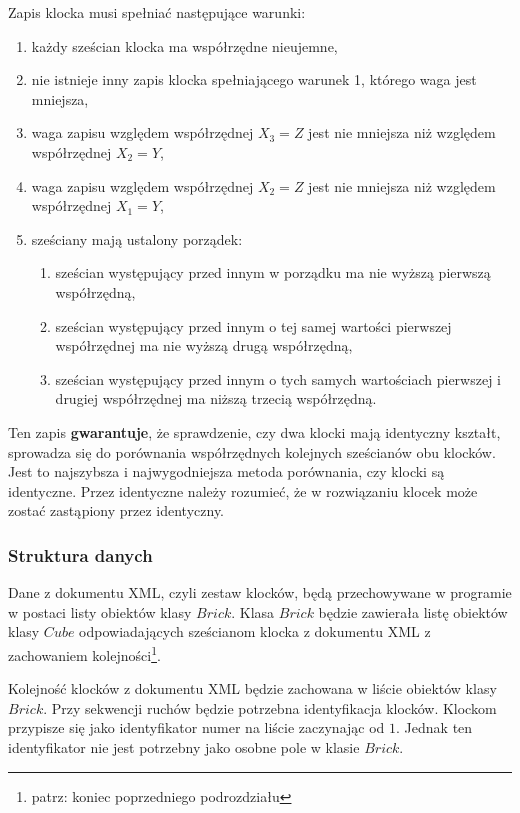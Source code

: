 \documentclass[12pt]{article}
\begin{document}
Zapis klocka musi spełniać następujące warunki:
\begin{enumerate}
	\item każdy sześcian klocka ma współrzędne nieujemne,
	\item nie istnieje inny zapis klocka spełniającego warunek 1, którego
		waga jest mniejsza,
	\item waga zapisu względem współrzędnej $X_3=Z$ jest nie mniejsza niż 
		względem współrzędnej $X_2=Y$,
	\item waga zapisu względem współrzędnej $X_2=Z$ jest nie mniejsza niż 
		względem współrzędnej $X_1=Y$,
	\item sześciany mają ustalony porządek:
		\begin{enumerate}
			\item sześcian występujący przed innym w porządku ma nie wyższą
				pierwszą współrzędną,
			\item sześcian występujący przed innym o tej samej wartości
				pierwszej współrzędnej ma nie wyższą drugą współrzędną,
			\item sześcian występujący przed innym o tych samych wartościach
				pierwszej i drugiej współrzędnej ma niższą trzecią współrzędną.
		\end{enumerate}
\end{enumerate}
Ten zapis \textbf{gwarantuje}, że sprawdzenie, czy dwa klocki mają
identyczny kształt, sprowadza się do porównania współrzędnych kolejnych
sześcianów obu klocków. Jest to najszybsza i najwygodniejsza metoda
porównania, czy klocki są identyczne. Przez identyczne należy rozumieć,
że w rozwiązaniu klocek może zostać zastąpiony przez identyczny.

\subsubsection{Struktura danych}
Dane z dokumentu XML, czyli zestaw klocków, będą przechowywane w programie
w postaci listy obiektów klasy $Brick$. Klasa $Brick$ będzie zawierała
listę obiektów klasy $Cube$ odpowiadających sześcianom klocka z dokumentu
XML z zachowaniem kolejności\footnote{patrz: koniec poprzedniego
podrozdziału}.

Kolejność klocków z dokumentu XML będzie zachowana w liście obiektów klasy
$Brick$. Przy sekwencji ruchów będzie potrzebna identyfikacja klocków.
Klockom przypisze się jako identyfikator numer na liście zaczynając od $1$.
Jednak ten identyfikator nie jest potrzebny jako osobne pole w klasie
$Brick$.
\end{document}
